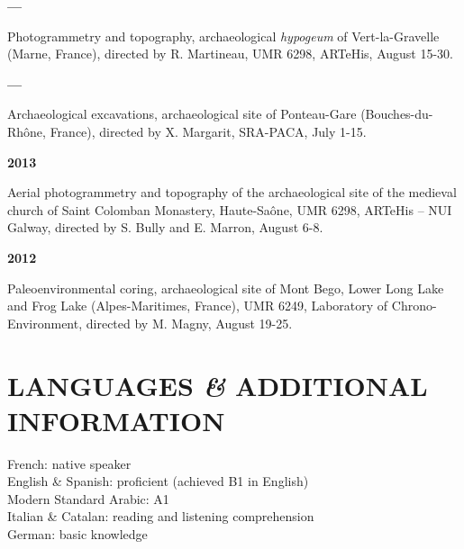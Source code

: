 \documentclass{article}
\newcommand{\fr}[1]{} %
\newcommand{\en}[1]{#1}   %
\begin{document}
{\smallbreak
\textbf{--- }
\fr{Photogrammétrie et topographie, \textit{hypogée} archéologique de Vert-la-Gravelle (Marne, France), dir. R. Martineau, UMR 6298, ARTeHis, 15-30 août.}
\en{Photogrammetry and topography, archaeological \textit{hypogeum} of Vert-la-Gravelle (Marne, France), directed by R. Martineau, UMR 6298, ARTeHis, August 15-30.}

\smallbreak
\textbf{---}
\fr{Fouilles archéologiques, site archéologique de Ponteau-Gare (Bouches-du-Rhône, France), dir. X. Margarit, SRA-PACA, 1-15 juillet.}
\en{Archaeological excavations, archaeological site of Ponteau-Gare (Bouches-du-Rhône, France), directed by X. Margarit, SRA-PACA, July 1-15.}

\smallbreak
\textbf{2013}
\fr{Photogrammétrie aérienne et topographie du site archéologique de l'église médiévale du monastère de Saint Colomban, Haute-Saône, UMR 6298, ARTeHis -- NUI Galway, dir. S. Bully et E. Marron, 6-8 août.}
\en{Aerial photogrammetry and topography of the archaeological site of the medieval church of Saint Colomban Monastery, Haute-Saône, UMR 6298, ARTeHis -- NUI Galway, directed by S. Bully and E. Marron, August 6-8.}

\smallbreak
\textbf{2012}
\fr{Carottage paléoenvironnemental, site archéologique du mont Bego, Lac Long Inférieur et Lac des Grenouilles (Alpes-Maritimes, France), UMR 6249, Laboratoire Chrono-Environnement, dir. M. Magny, 19-25 août.}
\en{Paleoenvironmental coring, archaeological site of Mont Bego, Lower Long Lake and Frog Lake (Alpes-Maritimes, France), UMR 6249, Laboratory of Chrono-Environment, directed by M. Magny, August 19-25.}

\section*{\fr{LANGUES \textit{\&} INFORMATIONS COMPLÉMENTAIRES}\en{LANGUAGES \textit{\&} ADDITIONAL INFORMATION}}

\fr{Français : langue maternelle \\
Anglais \& Espagnol : bon niveau (obtenu B1 en Anglais) \\
Arabe standard moderne : A1 \\
Italien \& Catalan : compréhension écrite et orale \\
Allemand : notions \\

Permis de conduire (permis B), Niveau 1 de plongée, Diplôme de Capacité d'Animation (BAFA)}
\en{French: native speaker \\
English \& Spanish: proficient (achieved B1 in English) \\
Modern Standard Arabic: A1 \\
Italian \& Catalan: reading and listening comprehension \\
German: basic knowledge \\

}}
\end{document}
